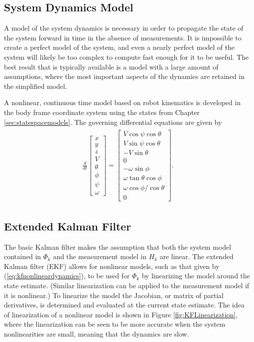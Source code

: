 \subsection{System Dynamics Model}
\label{sec:dynamics}
A model of the system dynamics is necessary in order to propagate the state of the system forward in time in the absence of measurements. It is impossible to create a perfect model of the system, and even a nearly perfect model of the system will likely be too complex to compute fast enough for it to be useful. The best result that is typically available is a model with a large amount of assumptions, where the most important aspects of the dynamics are retained in the simplified model.

A nonlinear, continuous time model based on robot kinematics is developed in the body frame coordinate system using the states from Chapter \ref{sec:statespacemodels}. The governing differential equations are given by
\begin{align}
\label{eq:kfnonlineardynamics}
\begin{split}
\frac{d}{dt}\left[\begin{array}{c}
x \\ y \\ z \\ V \\ \theta \\ \phi \\ \psi \\ \omega
\end{array}\right] =
\left[\begin{array}{c}
V\cos\psi\cos\theta \\
V\sin\psi\cos\theta \\
-V\sin\theta \\
0 \\
-\omega\sin\phi \\
\omega\tan\theta\cos\phi \\
\omega\cos\phi/\cos\theta \\
0
\end{array}\right].
\end{split}
\end{align}

\subsection{Extended Kalman Filter}
\label{sec:extendedkf}
The basic Kalman filter makes the assumption that both the system model contained in $\Phi_k$ and the measurement model in $H_k$ are linear. The extended Kalman filter (EKF) allows for nonlinear models, such as that given by (\ref{eq:kfnonlineardynamics}), to be used for $\Phi_k$ by linearizing the model around the state estimate. (Similar linearization can be applied to the measurement model if it is nonlinear.) To linearize the model the Jacobian, or matrix of partial derivatives, is determined and evaluated at the current state estimate. The idea of linearization of a nonlinear model is shown in Figure \ref{fig:KFLinearization}, where the linearization can be seen to be more accurate when the system nonlinearities are small, meaning that the dynamics are slow.

